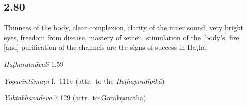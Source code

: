 \begin{ekdosis}
\begin{testimonia}[hp02_079]
\begin{versinnote}
\end{versinnote}
\end{testimonia}


\subsection*{2.80}
\begin{translation}[hp02_080]
Thinness of the body, clear complexion, clarity of the inner sound, very bright eyes, freedom from disease, mastery of semen, stimulation of the [body’s] fire [and] purification of the channels are the signs of success in Haṭha.
\end{translation}

\begin{testimonia}[hp02_080]
\emph{Haṭharatnāvalī} 1.59

\begin{versinnote}
\end{versinnote}

\emph{Yogacintāmaṇi} f.~111v (attr.~to the \emph{Haṭhapradīpikā})

\begin{versinnote}
\end{versinnote}

\emph{Yuktabhavadeva} 7.129 (attr.~to Gorakṣanātha)


\end{testimonia}
\end{ekdosis}
